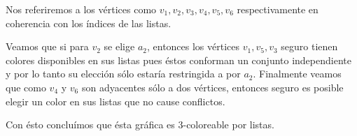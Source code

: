 \documentclass{article}
\begin{document}
\begin{enumerate}
   \begin{figure}[ht!]
     \centering
   \end{figure}

   Nos referiremos a los v\'ertices como $v_1,v_2,v_3,v_4,v_5,v_6$ respectivamente en coherencia con los \'indices de las listas.

   Veamos que si para $v_2$ se elige $a_2$, entonces los v\'ertices $v_1,v_5,v_3$ seguro tienen colores disponibles en sus listas pues \'estos conforman un conjunto independiente y por lo tanto su elecci\'on s\'olo estar\'ia restringida a por $a_2$. Finalmente veamos que como $v_4$ y $v_6$ son adyacentes s\'olo a dos v\'ertices, entonces seguro es posible elegir un color en sus listas que no cause conflictos.

   Con \'esto conclu\'imos que \'esta gr\'afica es $3$-coloreable por listas.

\end{enumerate}
\end{document}
